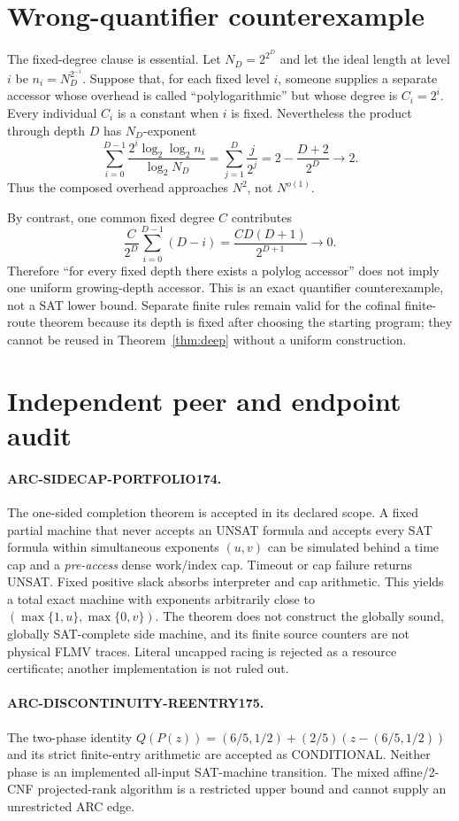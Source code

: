 \documentclass[11pt]{article}
\begin{document}
\section{Wrong-quantifier counterexample}
The fixed-degree clause is essential.  Let
$N_D=2^{2^D}$ and let the ideal length at level $i$ be
$n_i=N_D^{2^{-i}}$.  Suppose that, for each fixed level $i$, someone supplies
a separate accessor whose overhead is called ``polylogarithmic'' but whose
degree is $C_i=2^i$.  Every individual $C_i$ is a constant when $i$ is fixed.
Nevertheless the product through depth $D$ has $N_D$-exponent
\[
 \sum_{i=0}^{D-1}
 \frac{2^i\log_2\log_2 n_i}{\log_2N_D}
 =\sum_{j=1}^{D}\frac{j}{2^j}
 =2-\frac{D+2}{2^D}\longrightarrow2.
\]
Thus the composed overhead approaches $N^2$, not $N^{o(1)}$.

By contrast, one common fixed degree $C$ contributes
\[
 \frac{C}{2^D}\sum_{i=0}^{D-1}(D-i)
 =\frac{CD(D+1)}{2^{D+1}}\longrightarrow0.
\]
Therefore ``for every fixed depth there exists a polylog accessor'' does not
imply one uniform growing-depth accessor.  This is an exact quantifier
counterexample, not a SAT lower bound.  Separate finite rules remain valid
for the cofinal finite-route theorem because its depth is fixed after choosing
the starting program; they cannot be reused in Theorem~\ref{thm:deep} without
a uniform construction.

\section{Independent peer and endpoint audit}
\paragraph{ARC-SIDECAP-PORTFOLIO174.}
The one-sided completion theorem is accepted in its declared scope.  A fixed
partial machine that never accepts an UNSAT formula and accepts every SAT
formula within simultaneous exponents $(u,v)$ can be simulated behind a
time cap and a \emph{pre-access} dense work/index cap.  Timeout or cap failure
returns UNSAT.  Fixed positive slack absorbs interpreter and cap arithmetic.
This yields a total exact machine with exponents arbitrarily close to
$(\max\{1,u\},\max\{0,v\})$.  The theorem does not construct the globally
sound, globally SAT-complete side machine, and its finite source counters are
not physical FLMV traces.  Literal uncapped racing is rejected as a resource
certificate; another implementation is not ruled out.

\paragraph{ARC-DISCONTINUITY-REENTRY175.}
The two-phase identity
$Q(P(z))=(6/5,1/2)+(2/5)(z-(6/5,1/2))$ and its strict finite-entry arithmetic
are accepted as CONDITIONAL.  Neither phase is an implemented all-input
SAT-machine transition.  The mixed affine/2-CNF projected-rank algorithm is
a restricted upper bound and cannot supply an unrestricted ARC edge.
\end{document}
